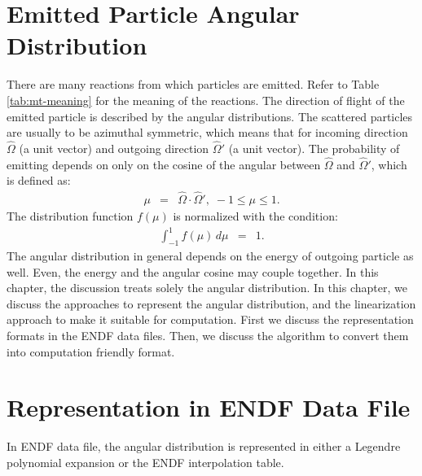 \section{Emitted Particle Angular Distribution}
There are many reactions from which particles are emitted. Refer to Table \ref{tab:mt-meaning} for the meaning of the reactions. The direction of flight of the emitted particle is described by the angular distributions. The scattered particles are usually to be azimuthal symmetric, which means that for incoming direction $\hat{\Omega}$ (a unit vector) and outgoing direction $\hat{\Omega}'$ (a unit vector). The probability of emitting depends on only on the cosine of the angular between $\hat{\Omega}$ and $\hat{\Omega}'$, which is defined as:
\begin{eqnarray}
\mu&=&\hat{\Omega}\cdot\hat{\Omega}',\;-1\leq\mu\leq1.
\end{eqnarray}
The distribution function $f(\mu)$ is normalized with the condition:
\begin{eqnarray}
\int_{-1}^{1}f(\mu)\,d\mu &=& 1.
\label{eq:als_norm}
\end{eqnarray}
The angular distribution in general depends on the energy of outgoing particle as well. Even, the energy and the angular cosine may couple together. In this chapter, the discussion treats solely the angular distribution. In this chapter, we discuss the approaches to represent the angular distribution, and the linearization approach to make it suitable for computation. First we discuss the representation formats in the ENDF data files. Then, we discuss the algorithm to convert them into computation friendly format.

\section{Representation in ENDF Data File}
In ENDF data file, the angular distribution is represented in either a Legendre polynomial expansion or the ENDF interpolation table. 
